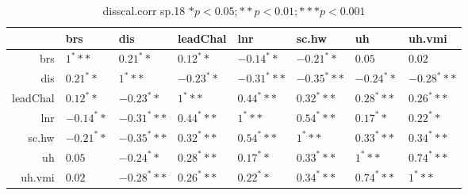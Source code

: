 \begin{table}[ht]
\centering
\begin{tabular}{rlllllll}
  \hline
 & brs & dis & leadChal & lnr & sc.hw & uh & uh.vmi \\ 
  \hline
brs & $1^***$ & $0.21^**$ & $0.12^**$ & $-0.14^**$ & $-0.21^**$ & $0.05$ & $0.02$ \\ 
  dis & $0.21^**$ & $1^***$ & $-0.23^**$ & $-0.31^***$ & $-0.35^***$ & $-0.24^**$ & $-0.28^***$ \\ 
  leadChal & $0.12^**$ & $-0.23^**$ & $1^***$ & $0.44^***$ & $0.32^***$ & $0.28^***$ & $0.26^***$ \\ 
  lnr & $-0.14^**$ & $-0.31^***$ & $0.44^***$ & $1^***$ & $0.54^***$ & $0.17^**$ & $0.22^**$ \\ 
  sc.hw & $-0.21^**$ & $-0.35^***$ & $0.32^***$ & $0.54^***$ & $1^***$ & $0.33^***$ & $0.34^***$ \\ 
  uh & $0.05$ & $-0.24^**$ & $0.28^***$ & $0.17^**$ & $0.33^***$ & $1^***$ & $0.74^***$ \\ 
  uh.vmi & $0.02$ & $-0.28^***$ & $0.26^***$ & $0.22^**$ & $0.34^***$ & $0.74^***$ & $1^***$ \\ 
   \hline
\end{tabular}
\caption{disscal.corr sp.18 $* p < 0.05; ** p < 0.01; *** p < 0.001$} 
\end{table}

